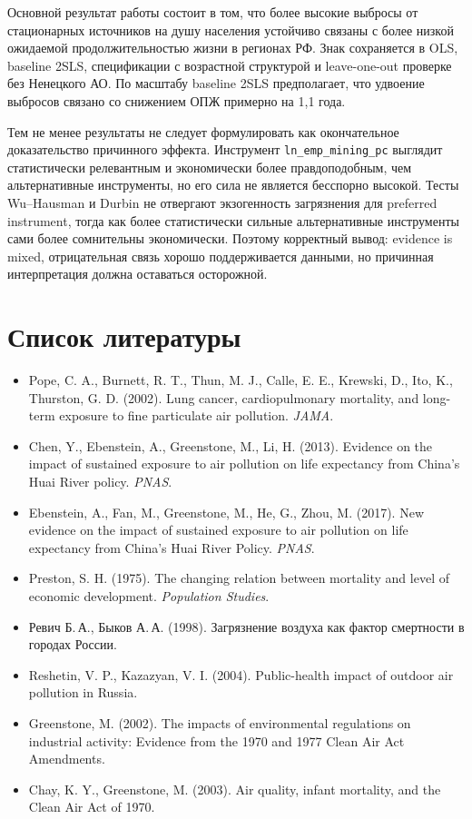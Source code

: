 \documentclass[10pt,a4paper]{article}
\begin{document}
Основной результат работы состоит в том, что более высокие выбросы от стационарных источников на душу населения устойчиво связаны с более низкой ожидаемой продолжительностью жизни в регионах РФ. Знак сохраняется в OLS, baseline 2SLS, спецификации с возрастной структурой и leave-one-out проверке без Ненецкого АО. По масштабу baseline 2SLS предполагает, что удвоение выбросов связано со снижением ОПЖ примерно на 1{,}1 года.

Тем не менее результаты не следует формулировать как окончательное доказательство причинного эффекта. Инструмент \texttt{ln\_emp\_mining\_pc} выглядит статистически релевантным и экономически более правдоподобным, чем альтернативные инструменты, но его сила не является бесспорно высокой. Тесты Wu--Hausman и Durbin не отвергают экзогенность загрязнения для preferred instrument, тогда как более статистически сильные альтернативные инструменты сами более сомнительны экономически. Поэтому корректный вывод: evidence is mixed, отрицательная связь хорошо поддерживается данными, но причинная интерпретация должна оставаться осторожной.

\section*{Список литературы}

\begin{itemize}[label={},leftmargin=0pt,itemsep=4pt]
\item Pope, C. A., Burnett, R. T., Thun, M. J., Calle, E. E., Krewski, D., Ito, K., Thurston, G. D. (2002). Lung cancer, cardiopulmonary mortality, and long-term exposure to fine particulate air pollution. \textit{JAMA}.
\item Chen, Y., Ebenstein, A., Greenstone, M., Li, H. (2013). Evidence on the impact of sustained exposure to air pollution on life expectancy from China's Huai River policy. \textit{PNAS}.
\item Ebenstein, A., Fan, M., Greenstone, M., He, G., Zhou, M. (2017). New evidence on the impact of sustained exposure to air pollution on life expectancy from China's Huai River Policy. \textit{PNAS}.
\item Preston, S. H. (1975). The changing relation between mortality and level of economic development. \textit{Population Studies}.
\item Ревич Б.\,А., Быков А.\,А. (1998). Загрязнение воздуха как фактор смертности в городах России.
\item Reshetin, V. P., Kazazyan, V. I. (2004). Public-health impact of outdoor air pollution in Russia.
\item Greenstone, M. (2002). The impacts of environmental regulations on industrial activity: Evidence from the 1970 and 1977 Clean Air Act Amendments.
\item Chay, K. Y., Greenstone, M. (2003). Air quality, infant mortality, and the Clean Air Act of 1970.
\end{itemize}
\end{document}
